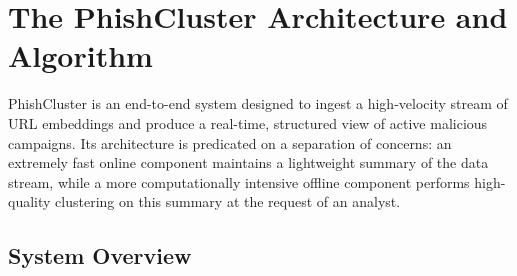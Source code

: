 \documentclass[journal,article,submit,pdftex,moreauthors]{Definitions/mdpi}
\begin{document}
\section{The PhishCluster Architecture and Algorithm}

PhishCluster is an end-to-end system designed to ingest a high-velocity stream of URL embeddings and produce a real-time, structured view of active malicious campaigns. Its architecture is predicated on a separation of concerns: an extremely fast online component maintains a lightweight summary of the data stream, while a more computationally intensive offline component performs high-quality clustering on this summary at the request of an analyst.

\subsection{System Overview}
\end{document}

